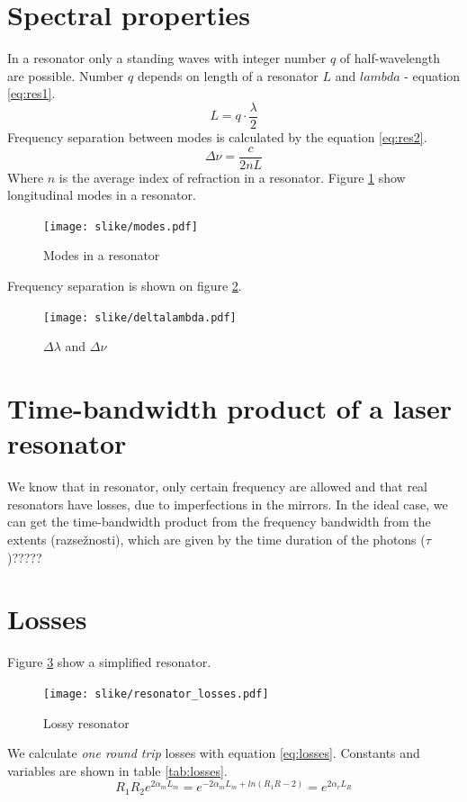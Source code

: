 \section{Spectral properties}
In a resonator only a standing waves with integer number $q$ of half-wavelength are possible.
Number $q$ depends on length of a resonator $L$ and $lambda$ - equation \ref{eq:res1}.
\begin{equation}
    L = q \cdot \frac{\lambda}{2}
    \label{eq:res1}
\end{equation}
Frequency separation between modes is calculated by the equation \ref{eq:res2}.
\begin{equation}
    \Delta \nu = \frac{c}{2 n L}
    \label{eq:res2}
\end{equation}
Where $n$ is the average index of refraction in a resonator. 
Figure \ref{fig:resmodes} show longitudinal modes in a resonator.
\begin{figure}[h!]
    \centering
    \texttt{[image: slike/modes.pdf]}
    \caption{Modes in a resonator}
    \label{fig:resmodes}
\end{figure}
Frequency separation is shown on figure \ref{fig:freqsep}.
\begin{figure}[h!]
    \centering
    \texttt{[image: slike/deltalambda.pdf]}
    \caption{$\Delta \lambda$ and $\Delta \nu$ }
    \label{fig:freqsep}
\end{figure}

\section{Time-bandwidth product of a laser resonator}

We know that in resonator, only certain frequency are allowed and that real resonators have losses, due to imperfections
in the mirrors. In the ideal case, we can get the time-bandwidth product from the frequency bandwidth from the extents (razsežnosti), which are given by the time duration of the photons ($\tau$)?????


\section{Losses}
Figure \ref{fig:schres} show a simplified resonator. 
\begin{figure}
    \centering
    \texttt{[image: slike/resonator\_losses.pdf]}
    \caption{Lossy resonator}
    \label{fig:schres}
\end{figure}
We calculate \textit{one round trip} losses with equation \ref{eq:losses}. Constants and variables are shown in table \ref{tab:losses}.
\begin{equation}
    R_1 R_2 e^{2 \alpha_m L_m} = e^{-2 \alpha_m L_m + ln(R_1 R-2)} = e^{2 \alpha_r L_R}
    \label{eq:losses}
\end{equation}


